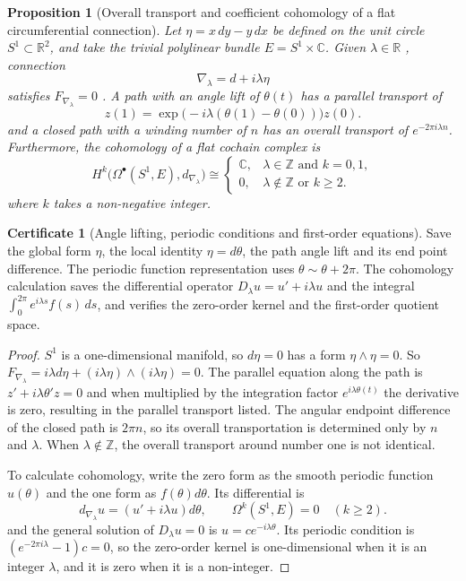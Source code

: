 \documentclass[12pt,a4paper,openany,notitlepage]{report}
\theoremstyle{plain}
\newtheorem{proposition}[theorem]{Proposition}
\theoremstyle{definition}
\newtheorem*{certificate}{Certificate}
\theoremstyle{remark}
\begin{document}
\begin{CJK*}
\begin{proposition}
[Overall transport and coefficient cohomology of a flat circumferential connection]\label{exp:geo:prop:circle-holonomy}
Let $\eta=x\,dy-y\,dx$ be defined on the unit circle $S^1\subset\mathbb R^2$, and take the trivial polylinear bundle $E=S^1\times\mathbb C$. Given $\lambda\in\mathbb R$ , connection \[
\nabla_\lambda=d+i\lambda\eta
\] satisfies $F_{\nabla_\lambda}=0$ . A path with an angle lift of $\theta(t)$ has a parallel transport of \[
z(1)=\exp\bigl(-i\lambda(\theta(1)-\theta(0))\bigr)z(0).
\] and a closed path with a winding number of $n$ has an overall transport of $e^{-2\pi i\lambda n}$. Furthermore, the cohomology of a flat cochain complex is \[
H^k\bigl(\Omega^\bullet(S^1,E),d_{\nabla_\lambda}\bigr)
\cong
\begin{cases}
\mathbb C,&\lambda\in\mathbb Z\text{ and }k=0,1,\\
0,&\lambda\notin\mathbb Z\text{ or }k\ge2.
\end{cases}
\] where $k$ takes a non-negative integer.\end{proposition}
\begin{certificate}
[Angle lifting, periodic conditions and first-order equations]Save the global form $\eta$, the local identity $\eta=d\theta$, the path angle lift and its end point difference. The periodic function representation uses $\theta\sim\theta+2\pi$. The cohomology calculation saves the differential operator $D_\lambda u=u'+i\lambda u$ and the integral $\int_0^{2\pi}e^{i\lambda s}f(s)\,ds$, and verifies the zero-order kernel and the first-order quotient space.\end{certificate}
\begin{proof}
$S^1$ is a one-dimensional manifold, so $d\eta=0$ has a form $\eta\wedge\eta=0$. So $F_{\nabla_\lambda}=i\lambda d\eta+(i\lambda\eta)\wedge(i\lambda\eta)=0$. The parallel equation along the path is $z'+i\lambda\theta'z=0$ and when multiplied by the integration factor $e^{i\lambda\theta(t)}$ the derivative is zero, resulting in the parallel transport listed. The angular endpoint difference of the closed path is $2\pi n$, so its overall transportation is determined only by $n$ and $\lambda$. When $\lambda\notin\mathbb Z$, the overall transport around number one is not identical.

To calculate cohomology, write the zero form as the smooth periodic function $u(\theta)$ and the one form as $f(\theta)d\theta$. Its differential is \[
d_{\nabla_\lambda}u=(u'+i\lambda u)d\theta,
\qquad\Omega^k(S^1,E)=0\quad(k\ge2).
\] and the general solution of $D_\lambda u=0$ is $u=c e^{-i\lambda\theta}$. Its periodic condition is $(e^{-2\pi i\lambda}-1)c=0$, so the zero-order kernel is one-dimensional when it is an integer $\lambda$, and it is zero when it is a non-integer.


\end{proof}
\end{CJK*}
\end{document}
